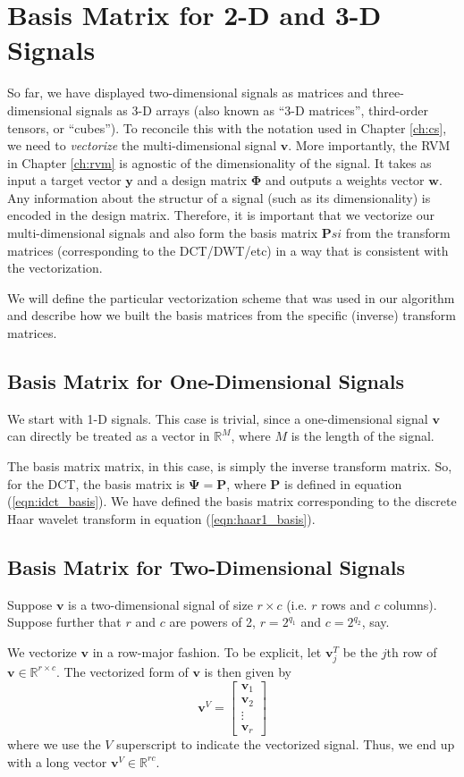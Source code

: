\section{Basis Matrix for 2-D and 3-D Signals}
So far, we have displayed two-dimensional signals as matrices and three-dimensional signals as 3-D arrays (also known as ``3-D matrices'', third-order tensors, or ``cubes'').
To reconcile this with the notation used in Chapter \ref{ch:cs}, we need to \emph{vectorize} the multi-dimensional signal $\bm v$.
More importantly, the RVM in Chapter \ref{ch:rvm} is agnostic of the dimensionality of the signal. 
It takes as input a target vector $\bm y$ and a design matrix $\bm \Phi$ and outputs a weights vector $\bm w$.
Any information about the structur of a signal (such as its dimensionality) is encoded in the design matrix.
Therefore, it is important that we vectorize our multi-dimensional signals and also form the basis matrix $\bm Psi$ from the transform matrices (corresponding to the DCT/DWT/etc) in a way that is consistent with the vectorization.

We will define the particular vectorization scheme that was used in our algorithm and describe how we built the basis matrices from the specific (inverse) transform matrices.

\subsection{Basis Matrix for One-Dimensional Signals}
We start with 1-D signals. 
This case is trivial, since a one-dimensional signal $\bm v$ can directly be treated as a vector in $\mathbb{R}^M$, where $M$ is the length of the signal.

The basis matrix matrix, in this case, is simply the inverse transform matrix.
So, for the DCT, the basis matrix is $\bm\Psi = \bm P$, where $\bm P$ is defined in equation (\ref{eqn:idct_basis}).
We have defined the basis matrix corresponding to the discrete Haar wavelet transform in equation (\ref{eqn:haar1_basis}).

\subsection{Basis Matrix for Two-Dimensional Signals}
\label{sect:vectorize2d}
Suppose $\bm v$ is a two-dimensional signal of size $r\times c$ (i.e. $r$ rows and $c$ columns).
Suppose further that $r$ and $c$ are powers of 2, $r=2^{q_1}$ and $c = 2^{q_2}$, say.

We vectorize $\bm v$ in a row-major fashion.
To be explicit, let $\bm v_j^T$ be the $j$th row of $\bm v\in\mathbb{R}^{r\times c}$.
The vectorized form of $\bm v$ is then given by
\begin{equation*}
  \bm v^V = \begin{bmatrix}
    \bm v_1 \\
    \bm v_2 \\
    \vdots \\
    \bm v_r
  \end{bmatrix}
\end{equation*}
where we use the $V$ superscript to indicate the vectorized signal.
Thus, we end up with a long vector $\bm v^V \in \mathbb{R}^{rc}$.

